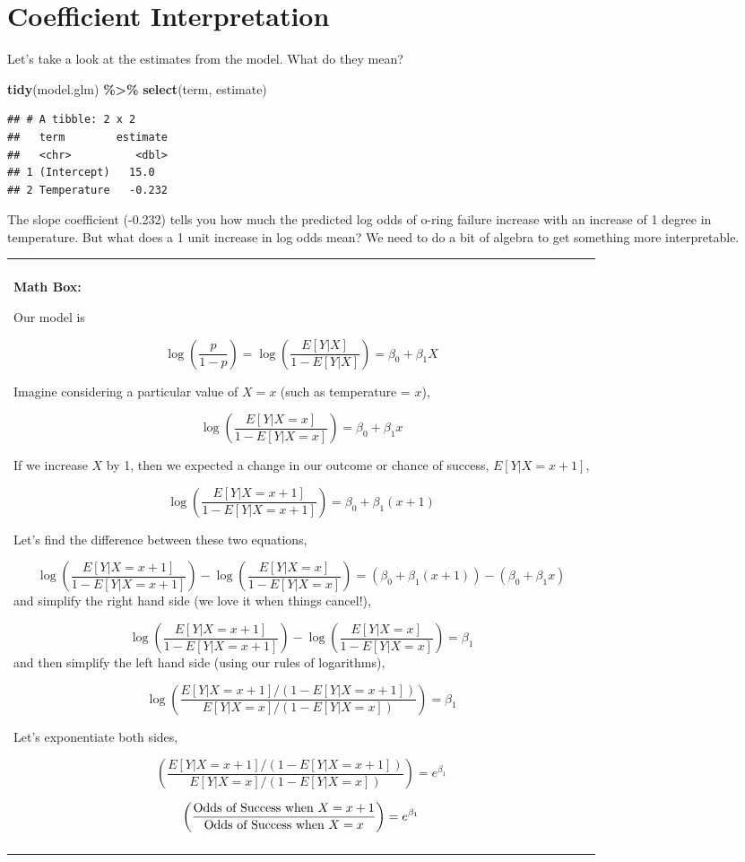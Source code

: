 \documentclass[
]{book}
\newenvironment{Shaded}{\begin{snugshade}}{\end{snugshade}}
\newcommand{\FunctionTok}[1]{\textcolor[rgb]{0.13,0.29,0.53}{\textbf{#1}}}
\newcommand{\NormalTok}[1]{#1}
\newcommand{\SpecialCharTok}[1]{\textcolor[rgb]{0.81,0.36,0.00}{\textbf{#1}}}
\newenvironment{mathbox}
{
    \begin{center}
    
    \begin{tabular}{|p{0.8\textwidth}|}
    \rowcolor{LightYellow}
    \hline\\
    \rowcolor{LightYellow}
    \textbf{Math Box:}
}
{
    \\\rowcolor{LightYellow}
    \\\hline
    \end{tabular} 
    \end{center}
}
\begin{document}
\section{Coefficient Interpretation}\label{coefficient-interpretation}

Let's take a look at the estimates from the model. What do they mean?

\begin{Shaded}
\begin{Highlighting}[]
\FunctionTok{tidy}\NormalTok{(model.glm) }\SpecialCharTok{\%\textgreater{}\%}
  \FunctionTok{select}\NormalTok{(term, estimate)}
\end{Highlighting}
\end{Shaded}

\begin{verbatim}
## # A tibble: 2 x 2
##   term        estimate
##   <chr>          <dbl>
## 1 (Intercept)   15.0  
## 2 Temperature   -0.232
\end{verbatim}

The slope coefficient (-0.232) tells you how much the predicted log odds of o-ring failure increase with an increase of 1 degree in temperature. But what does a 1 unit increase in log odds mean? We need to do a bit of algebra to get something more interpretable.

\begin{mathbox}
Our model is

\[\log\left(\frac{p}{1-p}\right) = \log\left(\frac{E[Y|X]}{1-E[Y|X]}\right) = \beta_0 +\beta_1X\]

Imagine considering a particular value of \(X=x\) (such as temperature =
\(x\)),

\[\log\left(\frac{E[Y|X=x]}{1-E[Y|X=x]}\right) = \beta_0 +\beta_1x\]

If we increase \(X\) by 1, then we expected a change in our outcome or
chance of success, \(E[Y|X = x+1]\),

\[\log\left(\frac{E[Y|X= x+1]}{1-E[Y|X= x+1]}\right) = \beta_0 +\beta_1(x+1)\]

Let's find the difference between these two equations,

\[\log\left(\frac{E[Y|X=x+1]}{1-E[Y|X=x+1]}\right)- \log\left(\frac{E[Y|X=x]}{1-E[Y|X=x]}\right)=  (\beta_0 +\beta_1(x+1)) - ( \beta_0 +\beta_1x)\]
and simplify the right hand side (we love it when things cancel!),

\[\log\left(\frac{E[Y|X=x+1]}{1-E[Y|X=x+1]}\right)- \log\left(\frac{E[Y|X=x]}{1-E[Y|X=x]}\right)=  \beta_1\]
and then simplify the left hand side (using our rules of logarithms),

\[\log\left( \frac{E[Y|X=x+1]/(1-E[Y|X=x+1])}{E[Y|X=x]/(1-E[Y|X=x])}\right) = \beta_1\]

Let's exponentiate both sides,

\[\left( \frac{E[Y|X=x+1]/(1-E[Y|X=x+1])}{E[Y|X=x]/(1-E[Y|X=x])}\right)= e^{\beta_1}\]

\[\left( \frac{\hbox{Odds of Success when }X=x+1}{\hbox{Odds of Success when }X=x}\right)= e^{\beta_1}\]
\end{mathbox}
\end{document}
